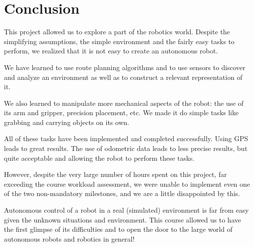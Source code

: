 \documentclass[a4paper, 10pt, conference]{ieeeconf}
\begin{document}
    
    \section{Conclusion}
    
    This project allowed us to explore a part of the robotics world. Despite the simplifying assumptions, the simple environment and the fairly easy tasks to perform, we realized that it is not easy to create an autonomous robot.
    
    We have learned to use route planning algorithms and to use sensors to discover and analyze an environment as well as to construct a relevant representation of it.
    
    We also learned to manipulate more mechanical aspects of the robot: the use of its arm and gripper, precision placement, etc. We made it do simple tasks like grabbing and carrying objects on its own.
    
    All of these tasks have been implemented and completed successfully. Using GPS leads to great results. The use of odometric data leads to less precise results, but quite acceptable and allowing the robot to perform these tasks.
    
    However, despite the very large number of hours spent on this project, far exceeding the course workload assessment, we were unable to implement even one of the two non-mandatory milestones, and we are a little disappointed by this.
    
    Autonomous control of a robot in a real (simulated) environment is far from easy given the unknown situations and environment. This course allowed us to have the first glimpse of its difficulties and to open the door to the large world of autonomous robots and robotics in general!
    
    
    
    
    \nocite{*}
    
    
    \newpage
    
\end{document}
